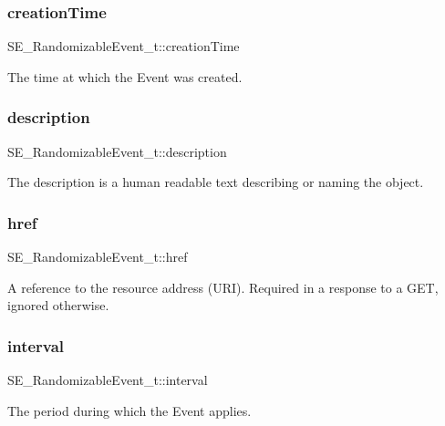 \subsubsection{\texorpdfstring{creation\+Time}{creationTime}}
{\footnotesize\ttfamily S\+E\+\_\+\+Randomizable\+Event\+\_\+t\+::creation\+Time}

The time at which the Event was created. \mbox{\label{group__RandomizableEvent_ga5ea5add0530a0829d95aad1326f7df9b}} 
\subsubsection{\texorpdfstring{description}{description}}
{\footnotesize\ttfamily S\+E\+\_\+\+Randomizable\+Event\+\_\+t\+::description}

The description is a human readable text describing or naming the object. \mbox{\label{group__RandomizableEvent_gae0c85b4710c2a67d48903e469e902161}} 
\subsubsection{\texorpdfstring{href}{href}}
{\footnotesize\ttfamily S\+E\+\_\+\+Randomizable\+Event\+\_\+t\+::href}

A reference to the resource address (U\+RI). Required in a response to a G\+ET, ignored otherwise. \mbox{\label{group__RandomizableEvent_gae999a6ae1f1d2329c6432ed09f24f327}} 
\subsubsection{\texorpdfstring{interval}{interval}}
{\footnotesize\ttfamily S\+E\+\_\+\+Randomizable\+Event\+\_\+t\+::interval}

The period during which the Event applies. \mbox{\label{group__RandomizableEvent_ga2e2218e01dc1e3dd2428ced1eaaf0c3c}} 
